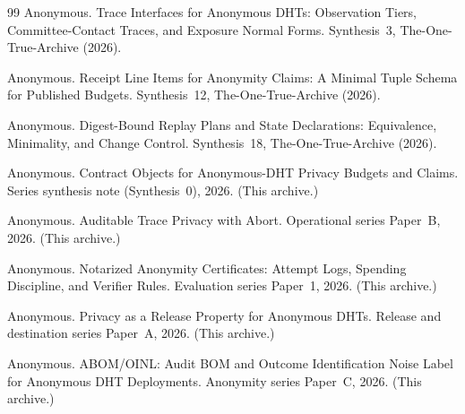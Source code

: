 \documentclass[11pt]{article}
\begin{document}
\begin{thebibliography}{99}
Anonymous.
\newblock Trace Interfaces for Anonymous DHTs: Observation Tiers, Committee-Contact Traces, and Exposure Normal Forms.
\newblock Synthesis~3, The-One-True-Archive (2026).

Anonymous.
\newblock Receipt Line Items for Anonymity Claims: A Minimal Tuple Schema for Published Budgets.
\newblock Synthesis~12, The-One-True-Archive (2026).

Anonymous.
\newblock Digest-Bound Replay Plans and State Declarations: Equivalence, Minimality, and Change Control.
\newblock Synthesis~18, The-One-True-Archive (2026).

Anonymous.
\newblock Contract Objects for Anonymous-DHT Privacy Budgets and Claims.
\newblock Series synthesis note (Synthesis~0), 2026. (This archive.)

Anonymous.
\newblock Auditable Trace Privacy with Abort.
\newblock Operational series Paper~B, 2026. (This archive.)

Anonymous.
\newblock Notarized Anonymity Certificates: Attempt Logs, Spending Discipline, and Verifier Rules.
\newblock Evaluation series Paper~1, 2026. (This archive.)

Anonymous.
\newblock Privacy as a Release Property for Anonymous DHTs.
\newblock Release and destination series Paper~A, 2026. (This archive.)

Anonymous.
\newblock ABOM/OINL: Audit BOM and Outcome Identification Noise Label for Anonymous DHT Deployments.
\newblock Anonymity series Paper~C, 2026. (This archive.)

\end{thebibliography}
\end{document}
